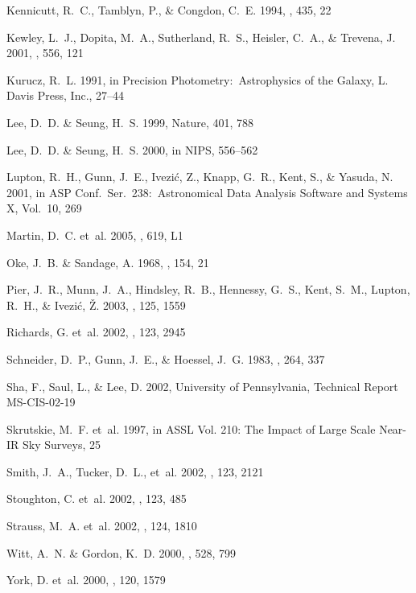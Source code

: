 \documentclass[10pt,preprint]{aastex}
\begin{document}
\begin{thebibliography}{39}
{Kennicutt}, R.~C., {Tamblyn}, P., \& {Congdon}, C.~E. 1994, \apj, 435, 22

{Kewley}, L.~J., {Dopita}, M.~A., {Sutherland}, R.~S., {Heisler}, C.~A., \&
  {Trevena}, J. 2001, \apj, 556, 121

Kurucz, R.~L. 1991, in Precision Photometry:\ Astrophysics of the Galaxy, L.
  Davis Press, Inc., 27--44

Lee, D.~D. \& Seung, H.~S. 1999, Nature, 401, 788

Lee, D.~D. \& Seung, H.~S. 2000, in {NIPS}, 556--562

Lupton, R.~H., Gunn, J.~E., {Ivezi{\'c}}, Z., Knapp, G.~R., Kent, S., \&
  Yasuda, N. 2001, in ASP Conf.\ Ser.\ 238:\ Astronomical Data Analysis
  Software and Systems X, Vol.~10, 269

Martin, D.~C. {et~al.} 2005, \apjl, 619, L1

{Oke}, J.~B. \& {Sandage}, A. 1968, \apj, 154, 21

Pier, J.~R., Munn, J.~A., Hindsley, R.~B., Hennessy, G.~S., Kent, S.~M.,
  Lupton, R.~H., \& {Ivezi{\' c}}, {\v Z}. 2003, \aj, 125, 1559

Richards, G. {et~al.} 2002, \aj, 123, 2945

{Schneider}, D.~P., {Gunn}, J.~E., \& {Hoessel}, J.~G. 1983, \apj, 264, 337

Sha, F., Saul, L., \& Lee, D. 2002, University of Pennsylvania, Technical
  Report MS-CIS-02-19

Skrutskie, M.~F. {et~al.} 1997, in ASSL Vol. 210: The Impact of Large Scale
  Near-IR Sky Surveys, 25

Smith, J.~A., Tucker, D.~L., {et~al.} 2002, \aj, 123, 2121

Stoughton, C. {et~al.} 2002, \aj, 123, 485

Strauss, M.~A. {et~al.} 2002, \aj, 124, 1810

{Witt}, A.~N. \& {Gordon}, K.~D. 2000, \apj, 528, 799

York, D. {et~al.} 2000, \aj, 120, 1579

\end{thebibliography}
\end{document}
